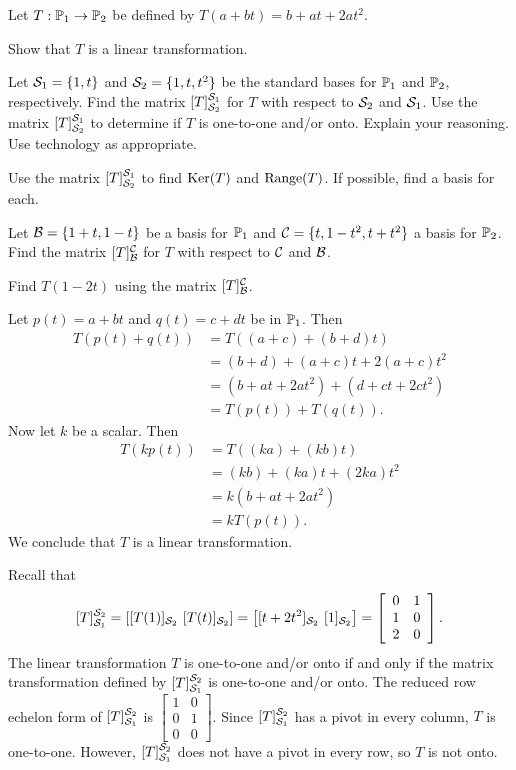 \begin{example} Let $T: \mathbb{P}_1 \to \mathbb{P}_2$ be defined by $T(a+bt) = b+at+2at^2$. 
\ba
\item Show that $T$ is a linear transformation.

\item Let $\mathcal{S}_1 = \{1,t\}$ and $\mathcal{S}_2 = \{1,t,t^2\}$ be the standard bases for $\mathbb{P}_1$ and $\mathbb{P}_2$, respectively. Find the matrix $[T]_{\mathcal{S}_2}^{\mathcal{S}_1}$ for $T$ with respect to $\mathcal{S}_2$ and $\mathcal{S}_1$. Use the matrix $[T]_{\mathcal{S}_2}^{\mathcal{S}_1}$ to determine if $T$ is one-to-one and/or onto. Explain your reasoning. Use technology as appropriate. 

\item Use the matrix $[T]_{\mathcal{S}_2}^{\mathcal{S}_1}$ to find $\text{Ker}(T)$ and $\text{Range}(T)$. If possible, find a basis for each. 

\item Let $\mathcal{B} = \{1+t,1-t\}$ be a basis for $\mathbb{P}_1$ and $\mathcal{C} = \{t, 1-t^2, t+t^2\}$ a basis for $\mathbb{P}_2$. Find the matrix $[T]_{\mathcal{B}}^{\mathcal{C}}$ for $T$ with respect to $\mathcal{C}$ and $\mathcal{B}$. 

\item Find $T(1-2t)$ using the matrix $[T]_{\mathcal{B}}^{\mathcal{C}}$. 


\ea


\ExampleSolution

\ba
\item Let $p(t)=a+bt$ and $q(t)=c+dt$ be in $\mathbb{P}_1$. Then
\begin{align*}
T(p(t)+q(t)) &= T((a+c)+(b+d)t)\\
	&= (b+d) + (a+c)t + 2(a+c)t^2 \\
	&= (b+at+2at^2) + (d+ct+2ct^2) \\
	&= T(p(t)) + T(q(t)).
\end{align*}
Now let $k$ be a scalar. Then
\begin{align*}
T(kp(t)) &= T((ka)+(kb)t) \\
	&= (kb)+(ka)t + (2ka)t^2 \\
	&= k(b+at+2at^2) \\
	&=kT(p(t)).
\end{align*}
We conclude that $T$ is a linear transformation. 

\item Recall that 
\[[T]_{\CS_1}^{\CS_2} = \left[ [T(1)]_{\CS_2} \ [T(t)]_{\CS_2} \right] = \left[ [t+2t^2]_{\CS_2} \ [1]_{\CS_2} \right] = \left[ \begin{array}{cc} 0&1\\1&0\\2&0 \end{array} \right].\]
The linear transformation $T$ is one-to-one and/or onto if and only if the matrix transformation defined by $[T]_{\mathcal{S}_1}^{\mathcal{S}_2}$ is one-to-one and/or onto. The reduced row echelon form of $[T]_{\mathcal{S}_1}^{\mathcal{S}_2}$ is $\left[ \begin{array}{cc} 1&0\\0&1\\0&0 \end{array} \right]$. Since $[T]_{\mathcal{S}_1}^{\mathcal{S}_2}$ has a pivot in every column, $T$ is one-to-one. However, $[T]_{\mathcal{S}_1}^{\mathcal{S}_2}$ does not have a pivot in every row, so $T$ is not onto. 


\end{example}
